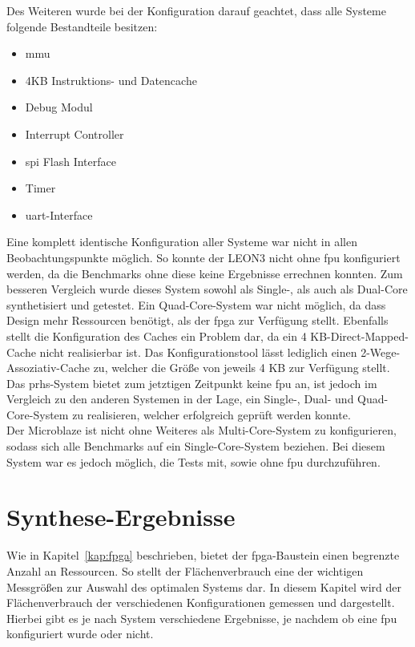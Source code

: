 Des Weiteren wurde bei der Konfiguration darauf geachtet, dass alle Systeme folgende Bestandteile besitzen:\\
\begin{itemize}
  \item \ac{mmu}
  \item 4KB Instruktions- und Datencache
  \item Debug Modul
  \item Interrupt Controller
  \item \ac{spi} Flash Interface
  \item Timer
  \item \ac{uart}-Interface
\end{itemize}

Eine komplett identische Konfiguration aller Systeme war nicht in allen Beobachtungspunkte möglich. So konnte der LEON3 nicht ohne \ac{fpu} konfiguriert werden, da die Benchmarks ohne diese
keine Ergebnisse errechnen konnten. Zum besseren Vergleich wurde dieses System sowohl als Single-, als auch als Dual-Core synthetisiert und getestet. Ein Quad-Core-System war nicht möglich,
da dass Design mehr Ressourcen benötigt, als der \ac{fpga} zur Verfügung stellt. Ebenfalls stellt die Konfiguration
des Caches ein Problem dar, da ein 4 KB-Direct-Mapped-Cache nicht realisierbar ist. Das Konfigurationstool lässt lediglich einen 2-Wege-Assoziativ-Cache zu, welcher die Größe von jeweils 4 KB
zur Verfügung stellt.\\
Das \ac{prhs}-System bietet zum jetztigen Zeitpunkt keine \ac{fpu} an, ist jedoch im Vergleich zu den anderen Systemen in der Lage, ein Single-, Dual- und Quad-Core-System zu realisieren,
 welcher erfolgreich geprüft werden konnte.\\
 Der Microblaze ist nicht ohne Weiteres als Multi-Core-System zu konfigurieren, sodass sich alle Benchmarks auf ein Single-Core-System beziehen. Bei diesem System war es jedoch möglich,
 die Tests mit, sowie ohne \ac{fpu} durchzuführen.\\



\section{Synthese-Ergebnisse}\label{kap:synthese}
Wie in Kapitel~\ref{kap:fpga} beschrieben, bietet der \ac{fpga}-Baustein einen begrenzte Anzahl an Ressourcen. So stellt der Flächenverbrauch eine der wichtigen Messgrößen zur Auswahl des
optimalen Systems dar. In diesem Kapitel wird der Flächenverbrauch der verschiedenen Konfigurationen gemessen und dargestellt. Hierbei gibt es je nach System verschiedene Ergebnisse, je nachdem
ob eine \ac{fpu} konfiguriert wurde oder nicht.\\

